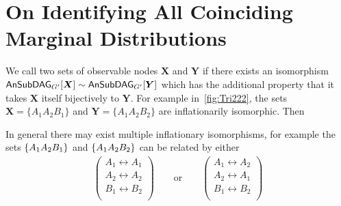 \section{On Identifying All Coinciding Marginal Distributions}\label{sec:coincidingdetails}





We call two sets of observable nodes $\bm{X}$ and $\bm{Y}$  if there exists an isomorphism $\ansubgraph[G']{\bm{X}}\sim\ansubgraph[G']{\bm{Y}}$ which has the additional property that it takes $\bm{X}$ itself bijectively to $\bm{Y}$. For example in~\cref{fig:Tri222}, the sets $\bm{X}=\{A_1 A_2 B_1\}$ and $\bm{Y}=\{A_1 A_2 B_2\}$ are inflationarily isomorphic. Then 

In general there may exist multiple inflationary isomorphisms, for example the sets $\brackets{A_1 A_2 B_1}$ and $\brackets{A_1 A_2 B_2}$ can be related by either 
\begin{align}
    \begin{pmatrix}
     A_1 \leftrightarrow A_1 \\
     A_2 \leftrightarrow A_2 \\
     B_1 \leftrightarrow B_2 \\
    \end{pmatrix}
    \qquad\text{or}\qquad
    \begin{pmatrix}
     A_1 \leftrightarrow A_2 \\
     A_2 \leftrightarrow A_1 \\
     B_1 \leftrightarrow B_2 \\
    \end{pmatrix}
\end{align}

